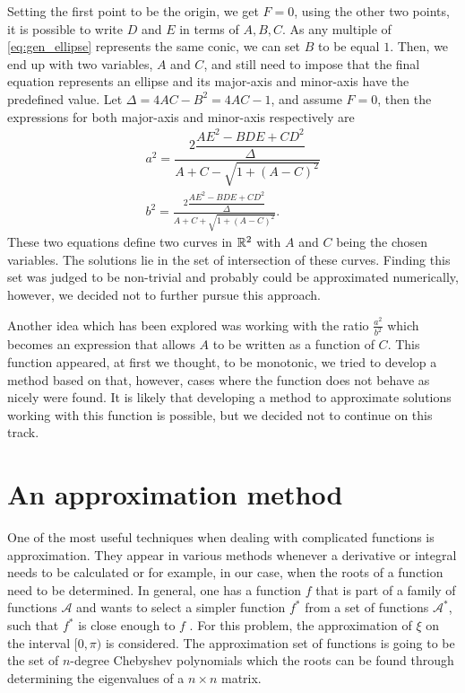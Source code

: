 Setting the first point to be the origin, we get $F=0$, using the other two points, it is possible to write $D$ and $E$ in terms of $A, B, C$. As any multiple of \autoref{eq:gen_ellipse} represents the same conic, we can set $B$ to be equal $1$. Then, we end up with two variables, $A$ and $C$, and still need to impose that the final equation represents an ellipse and its major-axis and minor-axis have the predefined value. Let $\Delta=4AC-B^2=4AC-1$, and assume $F=0$, then the expressions for both major-axis and minor-axis respectively are
\begin{align}\label{eq:gen_ellipse_a}
a^2 = \dfrac{2\dfrac{AE^2 -BDE +CD^2}{\Delta}}{A + C - \sqrt{1 + (A-C)^2}}\\
\label{eq:gen_ellipse_b}b^2 = \frac{2\dfrac{AE^2 -BDE +CD^2}{\Delta}}{A + C + \sqrt{1 + (A-C)^2}}.
\end{align}
These two equations define two curves in $\mathbb{R}^2$ with $A$ and $C$ being the chosen variables. The solutions lie in the set of intersection of these curves. Finding this set was judged to be non-trivial and probably could be approximated numerically, however, we decided not to further pursue this approach.

Another idea which has been explored was working with the ratio $\frac{a^2}{b^2}$ which becomes an expression that allows $A$ to be written as a function of $C$. This function appeared, at first we thought, to be monotonic, we tried to develop a method based on that, however, cases where the function does not behave as nicely were found. It is likely that developing a method to approximate solutions working with this function is possible, but we decided not to continue on this track.


\section{An approximation method}

One of the most useful techniques when dealing with complicated functions is approximation. They appear in various methods whenever a derivative or integral needs to be calculated or for example, in our case, when the roots of a function need to be determined. In general, one has a function $f$ that is part of a family of functions $\mathcal{A}$ and wants to select a simpler function $f^*$ from a set of functions $\mathcal{A^*}$, such that $f^*$ is close enough to $f$ \cite[p.~3]{powell}. For this problem, the approximation of $\xi$ on the interval $[0, \pi)$ is considered. The approximation set of functions is going to be the set of $n$-degree Chebyshev polynomials which the roots can be found through determining the eigenvalues of a $n\times n$ matrix.


